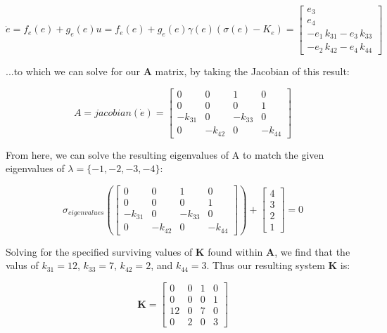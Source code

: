\documentclass{article}
\begin{document}
\begin{equation}
    \dot{e}=f_e(e)+g_e(e)u=f_e(e)+g_e(e)\gamma(e)(\sigma(e)-K_e) = \begin{bmatrix}
        e_3 \\
        e_4 \\
        -e_1 \,k_{31} -e_3 \,k_{33} \\
        -e_2 \,k_{42} -e_4 \,k_{44} 
    \end{bmatrix}
\end{equation}

...to which we can solve for our $\boldsymbol{A}$ matrix, by taking the Jacobian of this result:

\begin{equation}
    A = jacobian(\dot{e}) = \begin{bmatrix}
        0 & 0 & 1 & 0\\
        0 & 0 & 0 & 1\\
        -k_{31}  & 0 & -k_{33}  & 0\\
        0 & -k_{42}  & 0 & -k_{44} 
        \end{bmatrix}
\end{equation}

From here, we can solve the resulting eigenvalues of A to match the given eigenvalues of $\lambda = \{ -1, -2, -3, -4 \}$:

\begin{equation}
    \sigma_{eigenvalues}(\begin{bmatrix}
        0 & 0 & 1 & 0\\
        0 & 0 & 0 & 1\\
        -k_{31}  & 0 & -k_{33}  & 0\\
        0 & -k_{42}  & 0 & -k_{44} 
        \end{bmatrix}) + \begin{bmatrix}
        4 \\ 3 \\ 2 \\ 1
    \end{bmatrix} = 0
\end{equation}

Solving for the specified surviving values of $\boldsymbol{K}$ found within $\boldsymbol{A}$, we find that the valus of $k_{31} = 12$, $k_{33}=7$, $k_{42}=2$, and $k_{44}=3$. Thus our resulting system $\boldsymbol{K}$ is:

\begin{equation}
    \boldsymbol{K} = \begin{bmatrix}
        0 & 0 & 1 & 0 \\
        0 & 0 & 0 & 1 \\
        12& 0 & 7 & 0 \\
        0 & 2 & 0 & 3
    \end{bmatrix}
\end{equation}
\end{document}
